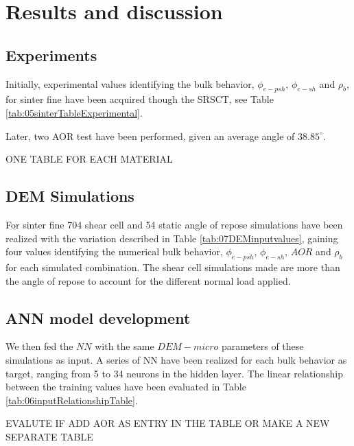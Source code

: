 \section{Results and discussion}
\label{sec:results}

\subsection{Experiments}
\label{subsec:experiments}

Initially, experimental values identifying the bulk behavior, $\phi_{e-psh}$, 
$\phi_{e-sh}$ and $\rho_{b}$, for sinter fine have been acquired though the
SRSCT, see Table \ref{tab:05sinterTableExperimental}.

Later, two AOR test have been performed, given an average angle of $38.85
^\circ$.
 
ONE TABLE FOR EACH MATERIAL

% 
% 

\subsection{DEM Simulations}
\label{subsec:simulations}
% 
For sinter fine 704 shear cell and 54 static angle of repose simulations have
been realized with the variation described in Table \ref{tab:07DEMinputvalues},
gaining four values identifying the numerical bulk behavior, $\phi_{e-psh}$, 
$\phi_{e-sh}$, $AOR$ and $\rho_{b}$ for each simulated combination.
The shear cell simulations made are more than the angle of repose to account for
the different normal load applied.



\subsection{ANN model development}
\label{subsec:annmodeldev}

We then fed the $NN$ with the same $DEM-micro$ parameters of these simulations
as input.
A series of NN have been realized for each bulk behavior as target, ranging from
5 to 34 neurons in the hidden layer.
The linear relationship between the
training values have been evaluated in Table \ref{tab:06inputRelationshipTable}.

EVALUTE IF ADD AOR AS ENTRY IN THE TABLE OR MAKE A NEW SEPARATE TABLE




